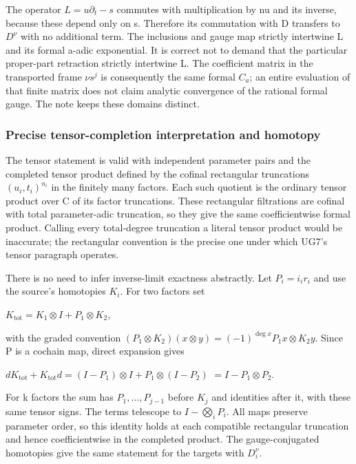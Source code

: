 \documentclass{article}
\begin{document}
The operator \(L=u\partial_t-s\) commutes with multiplication by nu and its inverse, because these depend only on s. Therefore its commutation with D transfers to \(D^\nu\) with no additional term. The inclusions and gauge map strictly intertwine L and its formal a-adic exponential. It is correct not to demand that the particular proper-part retraction strictly intertwine L. The coefficient matrix in the transported frame \(\nu s^j\) is consequently the same formal \(C_a\); an entire evaluation of that finite matrix does not claim analytic convergence of the rational formal gauge. The note keeps these domains distinct.

\subsubsection{Precise tensor-completion interpretation and homotopy}\label{endpoint-f1_unit_gauge_review--precise-tensor-completion-interpretation-and-homotopy}

The tensor statement is valid with independent parameter pairs and the completed tensor product defined by the cofinal rectangular truncations \((u_i,t_i)^{n_i}\) in the finitely many factors. Each such quotient is the ordinary tensor product over C of its factor truncations. These rectangular filtrations are cofinal with total parameter-adic truncation, so they give the same coefficientwise formal product. Calling every total-degree truncation a literal tensor product would be inaccurate; the rectangular convention is the precise one under which UG7's tensor paragraph operates.

There is no need to infer inverse-limit exactness abstractly. Let \(P_i=i_i r_i\) and use the source's homotopies \(K_i\). For two factors set

\(K_{\mathrm{tot}}=K_1\otimes I+P_1\otimes K_2\),

with the graded convention \((P_1\otimes K_2)(x\otimes y)=(-1)^{\deg x}P_1x\otimes K_2y\). Since P is a cochain map, direct expansion gives

\(dK_{\mathrm{tot}}+K_{\mathrm{tot}}d=(I-P_1)\otimes I+P_1\otimes(I-P_2)\) \(=I-P_1\otimes P_2\).

For k factors the sum has \(P_1,\ldots,P_{j-1}\) before \(K_j\) and identities after it, with these same tensor signs. The terms telescope to \(I-\bigotimes_i P_i\). All maps preserve parameter order, so this identity holds at each compatible rectangular truncation and hence coefficientwise in the completed product. The gauge-conjugated homotopies give the same statement for the targets with \(D_i^\nu\).
\end{document}
